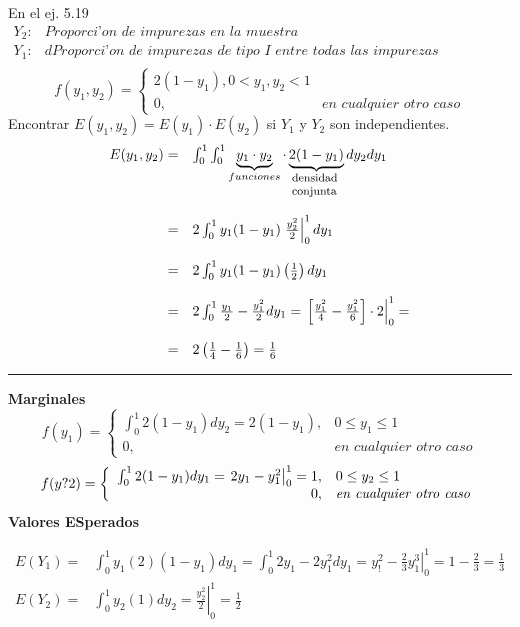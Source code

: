 \documentclass[12pt,letterpaper]{article}
\theoremstyle{definition}
\begin{document}
En el ej. 5.19
\[
\begin{array}{rl}
	Y_2:& \textit{Proporci'on de impurezas en la muestra}\\
	Y_1:& \textit{dProporci'on de impurezas de tipo I entre todas las impurezas encontradas}\\
\end{array}
\]
\[f(y_1,y_2)=\left\{
\begin{array}{rl}
	2(1-y_1),0<y_1,y_2<1&\\
	0, & \textit{en cualquier otro caso}
\end{array}\right.\]
Encontrar $E(y_1,y_2)=E(y_1)\cdot E(y_2)$ si $Y_1$ y $Y_2$ son independientes.
\[
\begin{array}{rlr}
	E(y_1,y_2)=& \int^1_0 \int^1_0 \underbrace{y_1\cdot y_2}_{funciones}\cdot \underbrace{2(1-y_1)}_{\parbox{3.5em}{\footnotesize densidad conjunta}}dy_2dy_1 \\ \\
	=& 2\int^1_0y_1(1-y_1)\left.\frac{y_2^2}{2}\right|^1_0dy_1\\ \\
	=& 2\int^1_0y_1(1-y_1)\left(\frac{1}{2}\right)dy_1\\ \\
	=& 2\int^1_0 \frac{y_1}{2}-\frac{y_1^2}{2}dy_1=\left.\left[\frac{y_1^2}{4}-\frac{y_1^2}{6}\right]\cdot 2\right|^1_0=\\ \\
	=& 2\left(\frac{1}{4}-\frac{1}{6}\right)=\frac{1}{6}
\end{array}
\]
\par\noindent\rule{\textwidth}{0.5pt}
\textbf{Marginales}
\[f(y_1)=\left\{
\begin{array}{rl}
	\int^1_0 2(1-y_1)dy_2=2(1-y_1),&0\leq y_1 \leq 1\\
	0, & \textit{en cualquier otro caso}
\end{array}\right.\]
\[f(y?2)=\left\{
\begin{array}{rl}
	\int^1_0 2(1-y_1)dy_1=\left.\vphantom{\frac{0}{0}} 2y_1-y_1^2\right|^1_0=1,& 0\leq y_2\leq 1\\
	0, & \textit{en cualquier otro caso}
\end{array}\right.\]
\textbf{Valores ESperados}

\[
\begin{array}{rl}
	E(Y_1)=&\int^1_0y_1 (2)(1-y_1)dy_1=\int^1_0 2y_1-2y_1^2dy_1=y_!^2-\left.\frac{2}{3}y_1^3\right|^1_0=1-\frac{2}{3}=\frac{1}{3}\\
	E(Y_2)=& \int^1_0 y_2(1)dy_2=\left.\frac{y_2^2}{2}\right|^1_0=\frac{1}{2}
\end{array}
\]
\end{document}
